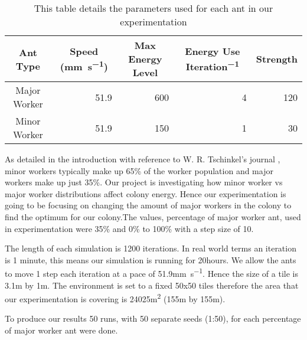 \begin{table}[htb]
  \centering
  \caption{This table details the parameters used for each ant in our experimentation}
  \label{tab:ant-parameters}
  \begin{tabular}{@{}crrrr@{}}
  \toprule
  Ant Type     & \multicolumn{1}{c}{Speed (\si{mm.s^{-1}})} & \multicolumn{1}{c}{Max Energy Level} & \multicolumn{1}{c}{Energy Use \si{Iteration^{-1}}} & \multicolumn{1}{c}{Strength} \\ \midrule
  Major Worker & 51.9                             &  600                                    & 4     & 120                                    \\ \midrule
  Minor Worker & 51.9                              & 150                                     & 1    & 30                                     \\ \bottomrule
  \end{tabular}
\end{table}

As detailed in the introduction with reference to W. R. Tschinkel's journal \cite{Tschinkel1988}, minor workers typically make up 65\% of the worker population and major workers make up just 35\%. Our project is investigating how minor worker vs major worker distributions affect colony energy. Hence our experimentation is going to be focusing on changing the amount of major workers in the colony to find the optimum for our colony.The values, percentage of major worker ant, used in experimentation were 35\% and 0\% to 100\% with a step size of 10.\par
 The length of each simulation is 1200 iterations. In real world terms an iteration is 1 minute, this means our simulation is running for 20hours. We allow the ants to move 1 step each iteration at a pace of 51.9\si{mm.s^{-1}}. Hence the size of a tile is 3.1\si{m} by 1\si{m}. The environment is set to a fixed 50x50 tiles therefore the area that our experimentation is covering is 24025\si{m^2} (155\si{m} by 155\si{m}).\par
 To produce our results 50 runs, with 50 separate seeds (1:50), for each percentage of major worker ant were done.\par

